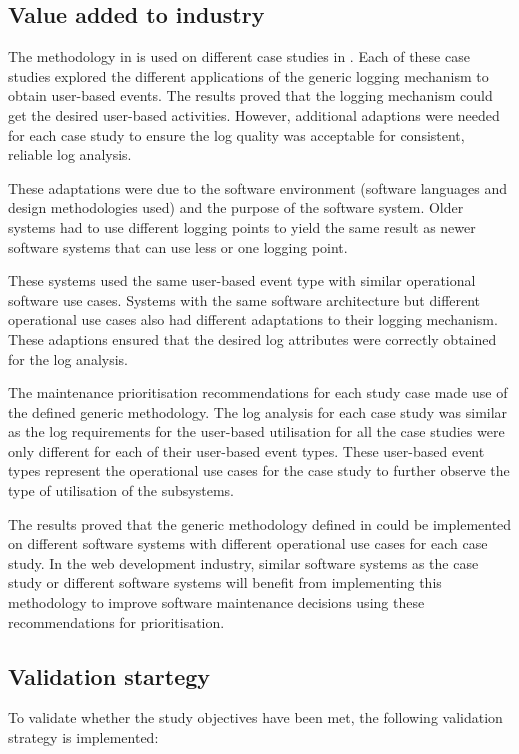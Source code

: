 \subsection{Value added to industry}
The methodology in  is used on different case studies in .
Each of these case studies explored the different applications of the generic logging mechanism to
obtain user-based events. The results proved that the logging mechanism could get the desired
user-based activities. However, additional adaptions were needed for each case study to ensure the
log quality was acceptable for consistent, reliable log analysis.\par These adaptations were due to
the software environment (software languages and design methodologies used) and the purpose of the
software system. Older systems had to use different logging points to yield the same result as newer
software systems that can use less or one logging point.\par These systems used the same user-based
event type with similar operational software use cases. Systems with the same software architecture
but different operational use cases also had different adaptations to their logging mechanism. These
adaptions ensured that the desired log attributes were correctly obtained for the log analysis. \par
The maintenance prioritisation recommendations for each study case made use of the defined generic
methodology. The log analysis for each case study was similar as the log requirements for the
user-based utilisation for all the case studies were only different for each of their user-based
event types. These user-based event types represent the operational use cases for the case study to
further observe the type of utilisation of the subsystems. \par The results proved that the generic
methodology defined in  could be implemented on different software systems with
different operational use cases for each case study. In the web development industry, similar
software systems as the case study or different software systems will benefit from implementing this
methodology to improve software maintenance decisions using these recommendations for
prioritisation.

\subsection{Validation startegy}
To validate whether the study objectives have been met, the following validation strategy is
implemented:

